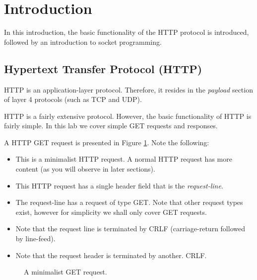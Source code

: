 \documentclass[pdftex,12pt,a4paper]{article}
\begin{document}
    \section{Introduction}
        In this introduction, the basic functionality of the HTTP protocol is
        introduced, followed by an introduction to socket programming.

        \subsection{Hypertext Transfer Protocol (HTTP)}
            HTTP is an application-layer protocol. Therefore, it resides in the
            \emph{payload} section of layer 4 protocols (such as TCP and UDP).

            HTTP is a fairly extensive protocol. However, the basic
            functionality of HTTP is fairly simple. In this lab we cover simple
            GET requests and responses.

            A HTTP GET request is presented in Figure \ref{fig:getreq}. Note
            the following:
            \begin{itemize}
                \item This is a minimalist HTTP request. A normal HTTP request
                has more content (as you will observe in later sections).
                \item This HTTP request has a single header field that is the
                \emph{request-line}.
                \item The request-line has a request of type GET. Note that
                    other request types exist, however for simplicity we shall
                    only cover GET requests.
                \item Note that the request line is terminated by CRLF
                    (carriage-return followed by line-feed).
                \item Note that the request header is terminated by another.
                    CRLF.
            \end{itemize}
            \begin{figure}[tbh]
                \centering
                
                \caption{A minimalist GET request.}
                \label{fig:getreq}
            \end{figure}
\end{document}
